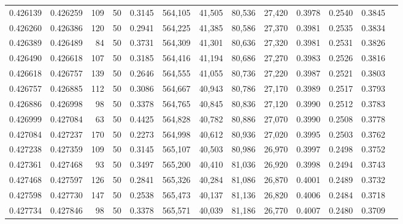 \begin{tabular}{rrrrrrrrrrrrr}
0.426139 & 0.426259 &   109 &  50 &                                     0.3145 & 564,105 &  41,505 &  80,536 &  27,420 & 0.3978 & 0.2540 & 0.3845 \\
0.426260 & 0.426386 &   120 &  50 &                                     0.2941 & 564,225 &  41,385 &  80,586 &  27,370 & 0.3981 & 0.2535 & 0.3834 \\
0.426389 & 0.426489 &    84 &  50 &                                     0.3731 & 564,309 &  41,301 &  80,636 &  27,320 & 0.3981 & 0.2531 & 0.3826 \\
0.426490 & 0.426618 &   107 &  50 &                                     0.3185 & 564,416 &  41,194 &  80,686 &  27,270 & 0.3983 & 0.2526 & 0.3816 \\
0.426618 & 0.426757 &   139 &  50 &                                     0.2646 & 564,555 &  41,055 &  80,736 &  27,220 & 0.3987 & 0.2521 & 0.3803 \\
0.426757 & 0.426885 &   112 &  50 &                                     0.3086 & 564,667 &  40,943 &  80,786 &  27,170 & 0.3989 & 0.2517 & 0.3793 \\
0.426886 & 0.426998 &    98 &  50 &                                     0.3378 & 564,765 &  40,845 &  80,836 &  27,120 & 0.3990 & 0.2512 & 0.3783 \\
0.426999 & 0.427084 &    63 &  50 &                                     0.4425 & 564,828 &  40,782 &  80,886 &  27,070 & 0.3990 & 0.2508 & 0.3778 \\
0.427084 & 0.427237 &   170 &  50 &                                     0.2273 & 564,998 &  40,612 &  80,936 &  27,020 & 0.3995 & 0.2503 & 0.3762 \\
0.427238 & 0.427359 &   109 &  50 &                                     0.3145 & 565,107 &  40,503 &  80,986 &  26,970 & 0.3997 & 0.2498 & 0.3752 \\
0.427361 & 0.427468 &    93 &  50 &                                     0.3497 & 565,200 &  40,410 &  81,036 &  26,920 & 0.3998 & 0.2494 & 0.3743 \\
0.427468 & 0.427597 &   126 &  50 &                                     0.2841 & 565,326 &  40,284 &  81,086 &  26,870 & 0.4001 & 0.2489 & 0.3732 \\
0.427598 & 0.427730 &   147 &  50 &                                     0.2538 & 565,473 &  40,137 &  81,136 &  26,820 & 0.4006 & 0.2484 & 0.3718 \\
0.427734 & 0.427846 &    98 &  50 &                                     0.3378 & 565,571 &  40,039 &  81,186 &  26,770 & 0.4007 & 0.2480 & 0.3709 \\

\end{tabular}
